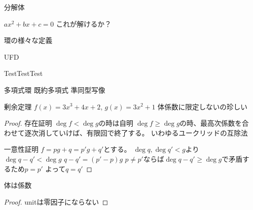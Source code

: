 \documentclass[11pt]{jsarticle}
\theoremstyle{jplain}
\newcommand{\AAAAAAAA}{TestTestTest}
\begin{document}
    分解体

    $ax^2+bx+c=0$
    これが解けるか？

    環の様々な定義

    UFD
    
%    
    \AAAAAAAA

    多項式環
    既約多項式
    準同型写像

    剰余定理
    $f(x)=3x^3+4x+2$, $g(x)=3x^2+1$
    体係数に限定しないの珍しい
    \begin{proof}
        存在証明
        $\deg{f} < \deg{g}$の時は自明
        $\deg{f} \geq \deg{g}$の時、最高次係数を合わせて逐次消していけば、有限回で終了する。
        いわゆるユークリッドの互除法

        一意性証明
        $f=pg+q=p'g+q'$とする。
        $\deg{q}, \deg{q'} < {g}$より$\deg{q-q'}<\deg{g}$
        $q-q'=(p'-p)g$
        $p\neq p'$ならば$\deg{q-q'}\geq\deg{g}$で矛盾するため$p=p'$
        よって$q=q'$
    \end{proof}

    体は係数
    \begin{proof}
        unitは零因子にならない
    \end{proof}
\end{document}
